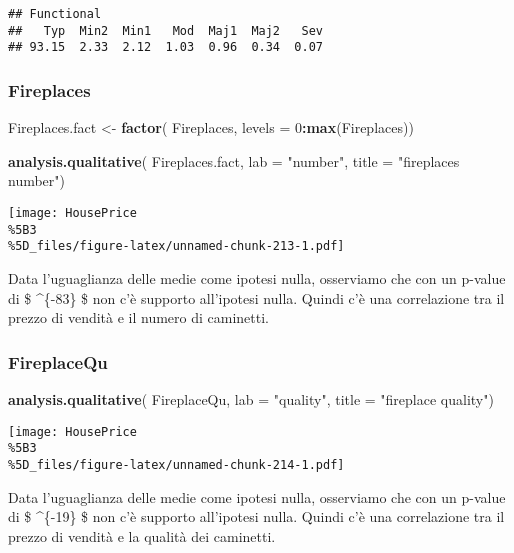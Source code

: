 \documentclass[
]{article}
\newenvironment{Shaded}{\begin{snugshade}}{\end{snugshade}}
\newcommand{\AttributeTok}[1]{\textcolor[rgb]{0.13,0.29,0.53}{#1}}
\newcommand{\DecValTok}[1]{\textcolor[rgb]{0.00,0.00,0.81}{#1}}
\newcommand{\FunctionTok}[1]{\textcolor[rgb]{0.13,0.29,0.53}{\textbf{#1}}}
\newcommand{\NormalTok}[1]{#1}
\newcommand{\OtherTok}[1]{\textcolor[rgb]{0.56,0.35,0.01}{#1}}
\newcommand{\SpecialCharTok}[1]{\textcolor[rgb]{0.81,0.36,0.00}{\textbf{#1}}}
\newcommand{\StringTok}[1]{\textcolor[rgb]{0.31,0.60,0.02}{#1}}
\begin{document}
\begin{verbatim}
## Functional
##   Typ  Min2  Min1   Mod  Maj1  Maj2   Sev 
## 93.15  2.33  2.12  1.03  0.96  0.34  0.07
\end{verbatim}

\subsubsection{Fireplaces}\label{fireplaces-1}

\begin{Shaded}
\begin{Highlighting}[]
\NormalTok{Fireplaces.fact }\OtherTok{\textless{}{-}} \FunctionTok{factor}\NormalTok{(}
\NormalTok{    Fireplaces,}
    \AttributeTok{levels =} \DecValTok{0}\SpecialCharTok{:}\FunctionTok{max}\NormalTok{(Fireplaces))}

\FunctionTok{analysis.qualitative}\NormalTok{(}
\NormalTok{    Fireplaces.fact,}
    \AttributeTok{lab =} \StringTok{"number"}\NormalTok{,}
    \AttributeTok{title =} \StringTok{"fireplaces number"}\NormalTok{)}
\end{Highlighting}
\end{Shaded}

\texttt{[image: HousePrice\\\%5B3\\\%5D\_files/figure-latex/unnamed-chunk-213-1.pdf]}

Data l'uguaglianza delle medie come ipotesi nulla, osserviamo che con un
p-value di \$ \^{}\{-83\} \$ non c'è supporto all'ipotesi
nulla. Quindi c'è una correlazione tra il prezzo di vendità e il numero
di caminetti.

\subsubsection{FireplaceQu}\label{fireplacequ-1}

\begin{Shaded}
\begin{Highlighting}[]
\FunctionTok{analysis.qualitative}\NormalTok{(}
\NormalTok{    FireplaceQu,}
    \AttributeTok{lab =} \StringTok{"quality"}\NormalTok{,}
    \AttributeTok{title =} \StringTok{"fireplace quality"}\NormalTok{)}
\end{Highlighting}
\end{Shaded}

\texttt{[image: HousePrice\\\%5B3\\\%5D\_files/figure-latex/unnamed-chunk-214-1.pdf]}

Data l'uguaglianza delle medie come ipotesi nulla, osserviamo che con un
p-value di \$ \^{}\{-19\} \$ non c'è supporto all'ipotesi
nulla. Quindi c'è una correlazione tra il prezzo di vendità e la qualità
dei caminetti.
\end{document}
